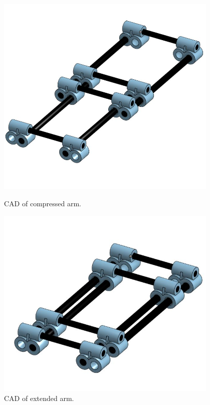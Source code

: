 \begin{figure}[ht]
\centering
\begin{minipage}[b]{.48\textwidth}
  \centering
  \includegraphics[width=0.95\textwidth]{Meetings/October/10-29-21/10-29-21_CAD_Figure3 - Nathan Forrer.JPG}
  \caption{CAD of compressed arm.}
  \label{fig:102921_5}
\end{minipage}%
\hfill%
\begin{minipage}[b]{.48\textwidth}
  \centering
  \includegraphics[width=0.95\textwidth]{Meetings/October/10-29-21/10-29-21_CAD_Figure4 - Nathan Forrer.JPG}
  \caption{CAD of extended arm.}
  \label{fig:102921_6}
\end{minipage}
\end{figure}

